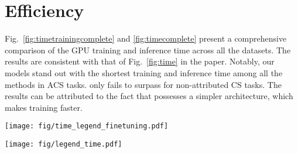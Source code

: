 \section*{Efficiency}
Fig.~\ref{fig:timetrainingcomplete} and \ref{fig:timecomplete} present a comprehensive comparison of the GPU training and inference time across all the datasets. The results are consistent with that of Fig.~\ref{fig:time} in the paper. Notably, our \IACS models stand out with the shortest training and inference time among all the methods in ACS tasks.
\IACS only fails to surpass \Featrans for non-attributed CS tasks. The results can be attributed to the fact that \Featrans possesses a simpler architecture, which makes training faster. 

\begin{figure*}
  \centering
  \texttt{[image: fig/time\_legend\_finetuning.pdf]}
   \caption{Overall Comparison of Training Time (Second)}
 \label{fig:timetrainingcomplete}
\end{figure*}

\begin{figure*}
  \centering
  \texttt{[image: fig/legend\_time.pdf]}
   \caption{Overall Comparison of Inference Time (Second)}
 \label{fig:timecomplete}
\end{figure*}


